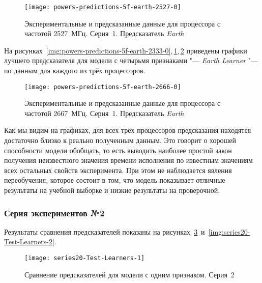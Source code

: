 \begin{figure}[H]
    \begin{center}
        \texttt{[image: powers-predictions-5f-earth-2527-0]}
        \caption{Экспериментальные и предсказанные данные для процессора с частотой 2527~МГц. Серия~1. Предсказатель \textit{Earth}}
        \label{img:powers-predictions-5f-earth-2527-0}
    \end{center}
\end{figure}

На рисунках~\ref{img:powers-predictions-5f-earth-2333-0},\,\ref{img:powers-predictions-5f-earth-2527-0},\,\ref{img:powers-predictions-5f-earth-2666-0} приведены графики лучшего предсказателя для модели с четырьмя признаками "--- \textit{Earth Learner} "--- по данным для каждого из трёх процессоров.

\begin{figure}[H]
    \begin{center}
        \texttt{[image: powers-predictions-5f-earth-2666-0]}
        \caption{Экспериментальные и предсказанные данные для процессора с частотой 2667~МГц. Серия~1. Предсказатель \textit{Earth}}
        \label{img:powers-predictions-5f-earth-2666-0}
    \end{center}
\end{figure}

Как мы видим на графиках, для всех трёх процессоров предсказания находятся достаточно близко к реально полученным данным. Это говорит о хорошей способности модели обобщать, то есть выводить наиболее простой закон получения неизвестного значения времени исполнения по известным значениям всех остальных свойств эксперимента. При этом не наблюдается явления переобучения, которое состоит в том, что модель показывает отличные результаты на учебной выборке и низкие результаты на проверочной.


\subsubsection{Серия экспериментов №2}

Результаты сравнения предсказателей показаны на рисунках~\ref{img:series20-Test-Learners-1}~и~\ref{img:series20-Test-Learners-2}.

\begin{figure}[H]
    \begin{center}
            \texttt{[image: series20-Test-Learners-1]}
            \caption{Сравнение предсказателей для модели с одним признаком. Серия~2} %
            \label{img:series20-Test-Learners-1} %
    \end{center}
\end{figure}

